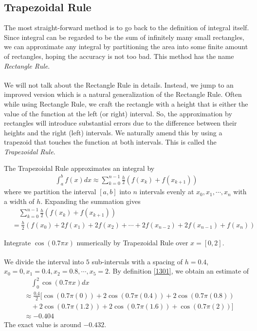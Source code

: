 \subsection{Trapezoidal Rule}
The most straight-forward method is to go back to the definition of integral itself. Since integral can be regarded to be the sum of infinitely many small rectangles, we can approximate any integral by partitioning the area into some finite amount of rectangles, hoping the accuracy is not too bad. This method has the name \textit{Rectangle Rule}.\\
\\
We will not talk about the Rectangle Rule in details. Instead, we jump to an improved version which is a natural generalization of the Rectangle Rule. Often while using Rectangle Rule, we craft the rectangle with a height that is either the value of the function at the left (or right) interval. So, the approximation by rectangles will introduce substantial errors due to the difference between their heights and the right (left) intervals. We naturally amend this by using a trapezoid that touches the function at both intervals. This is called the \textit{Trapezoidal Rule}.\\
\begin{defn}
\label{1301}
The Trapezoidal Rule approximates an integral by
\begin{align*}
\int_a^b f(x) dx \approx \sum_{k=0}^{n-1} \frac{h}{2} (f(x_k) + f(x_{k+1}))  
\end{align*}
where we partition the interval $[a,b]$ into $n$ intervals evenly at $x_0, x_1, \cdots, x_n$ with a width of $h$. Expanding the summation gives
\begin{align*}
&\quad \sum_{k=0}^{n-1} \frac{h}{2} (f(x_k) + f(x_{k+1})) \\
&= \frac{h}{2} (f(x_0) + 2f(x_1) + 2f(x_2) + \cdots + 2f(x_{n-2}) + 2f(x_{n-1}) + f(x_n))
\end{align*}
\end{defn}

\begin{exmp}
Integrate $\cos(0.7\pi x)$ numerically by Trapezoidal Rule over $x = [0,2]$.\\
\\
We divide the interval into $5$ sub-intervals with a spacing of $h = 0.4$, $x_0 = 0, x_1 = 0.4, x_2 = 0.8, \cdots, x_5 = 2$. By definition \ref{1301}, we obtain an estimate of
\begin{align*}
&\quad \int_0^2 \cos(0.7\pi x) dx \\
&\approx \frac{0.4}{2} [\cos(0.7\pi (0)) + 2\cos(0.7\pi (0.4)) + 2\cos(0.7\pi (0.8))\\
&\quad + 2\cos(0.7\pi (1.2)) + 2\cos(0.7\pi (1.6)) + \cos(0.7\pi (2))] \\
&\approx -0.404
\end{align*}
The exact value is around $-0.432$.
\end{exmp}

